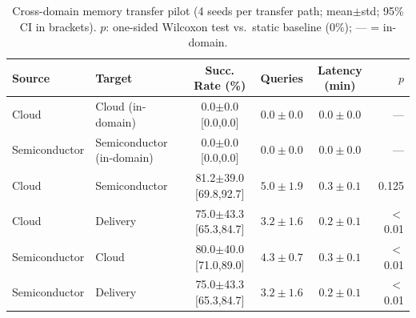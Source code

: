 \begin{table}[t]
\centering
\caption{Cross-domain memory transfer pilot (4 seeds per transfer path; mean$\pm$std; 95\% CI in brackets). $p$: one-sided Wilcoxon test vs.\ static baseline (0\%); --- = in-domain.}
\label{tab:transfer}
\small
\begin{tabular}{@{}llcccr@{}}
\toprule
  Source & Target & Succ. Rate (\%) & Queries & Latency (min) & $p$ \\
\midrule
  Cloud & Cloud (in-domain) & 0.0$\pm$0.0 [0.0,0.0] & $0.0\pm0.0$ & $0.0\pm0.0$ & --- \\
  Semiconductor & Semiconductor (in-domain) & 0.0$\pm$0.0 [0.0,0.0] & $0.0\pm0.0$ & $0.0\pm0.0$ & --- \\
  Cloud & Semiconductor & 81.2$\pm$39.0 [69.8,92.7] & $5.0\pm1.9$ & $0.3\pm0.1$ & 0.125 \\
  Cloud & Delivery & 75.0$\pm$43.3 [65.3,84.7] & $3.2\pm1.6$ & $0.2\pm0.1$ & $<$0.01 \\
  Semiconductor & Cloud & 80.0$\pm$40.0 [71.0,89.0] & $4.3\pm0.7$ & $0.3\pm0.1$ & $<$0.01 \\
  Semiconductor & Delivery & 75.0$\pm$43.3 [65.3,84.7] & $3.2\pm1.6$ & $0.2\pm0.1$ & $<$0.01 \\
\bottomrule
\end{tabular}
\end{table}